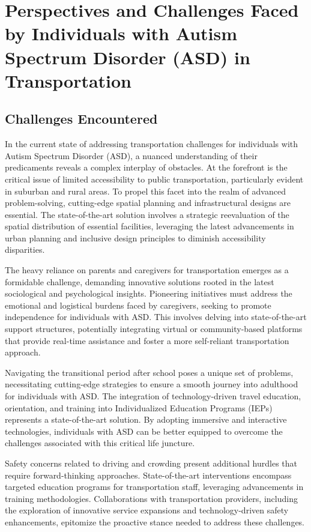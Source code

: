 \section{Perspectives and Challenges Faced by Individuals with Autism Spectrum Disorder (ASD) in Transportation}

\subsection{Challenges Encountered}

    In the current state of addressing transportation challenges for individuals with Autism Spectrum Disorder (ASD), a nuanced understanding of their predicaments reveals a complex interplay of obstacles. At the forefront is the critical issue of limited accessibility to public transportation, particularly evident in suburban and rural areas. To propel this facet into the realm of advanced problem-solving, cutting-edge spatial planning and infrastructural designs are essential. The state-of-the-art solution involves a strategic reevaluation of the spatial distribution of essential facilities, leveraging the latest advancements in urban planning and inclusive design principles to diminish accessibility disparities.

    The heavy reliance on parents and caregivers for transportation emerges as a formidable challenge, demanding innovative solutions rooted in the latest sociological and psychological insights. Pioneering initiatives must address the emotional and logistical burdens faced by caregivers, seeking to promote independence for individuals with ASD. This involves delving into state-of-the-art support structures, potentially integrating virtual or community-based platforms that provide real-time assistance and foster a more self-reliant transportation approach.
    
    Navigating the transitional period after school poses a unique set of problems, necessitating cutting-edge strategies to ensure a smooth journey into adulthood for individuals with ASD. The integration of technology-driven travel education, orientation, and training into Individualized Education Programs (IEPs) represents a state-of-the-art solution. By adopting immersive and interactive technologies, individuals with ASD can be better equipped to overcome the challenges associated with this critical life juncture.
    
    Safety concerns related to driving and crowding present additional hurdles that require forward-thinking approaches. State-of-the-art interventions encompass targeted education programs for transportation staff, leveraging advancements in training methodologies. Collaborations with transportation providers, including the exploration of innovative service expansions and technology-driven safety enhancements, epitomize the proactive stance needed to address these challenges.
    
